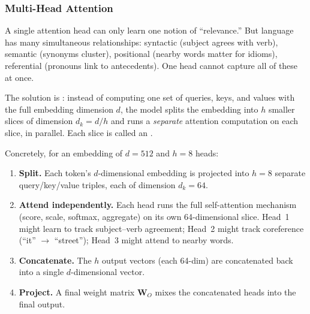 \subsubsection{Multi-Head Attention}

A single attention head can only learn one notion of ``relevance.''
But language has many simultaneous relationships: syntactic (subject
agrees with verb), semantic (synonyms cluster), positional (nearby
words matter for idioms), referential (pronouns link to antecedents).
One head cannot capture all of these at once.

The solution is : instead of computing
one set of queries, keys, and values with the full embedding dimension
$d$, the model splits the embedding into $h$ smaller slices of
dimension $d_k = d/h$ and runs a \emph{separate} attention
computation on each slice, in parallel. Each slice is called an
.

Concretely, for an embedding of $d = 512$ and $h = 8$ heads:

\begin{enumerate}[leftmargin=2em]
  \item \textbf{Split.} Each token's $d$-dimensional embedding is
    projected into $h = 8$ separate query/key/value triples, each of
    dimension $d_k = 64$.
  \item \textbf{Attend independently.} Each head runs the full
    self-attention mechanism (score, scale, softmax, aggregate) on
    its own 64-dimensional slice. Head~1 might learn to track
    subject--verb agreement; Head~2 might track coreference
    (``it'' $\to$ ``street''); Head~3 might attend to nearby words.
  \item \textbf{Concatenate.} The $h$ output vectors (each 64-dim)
    are concatenated back into a single $d$-dimensional vector.
  \item \textbf{Project.} A final weight matrix $\bm{W}_O$ mixes
    the concatenated heads into the final output.
\end{enumerate}

